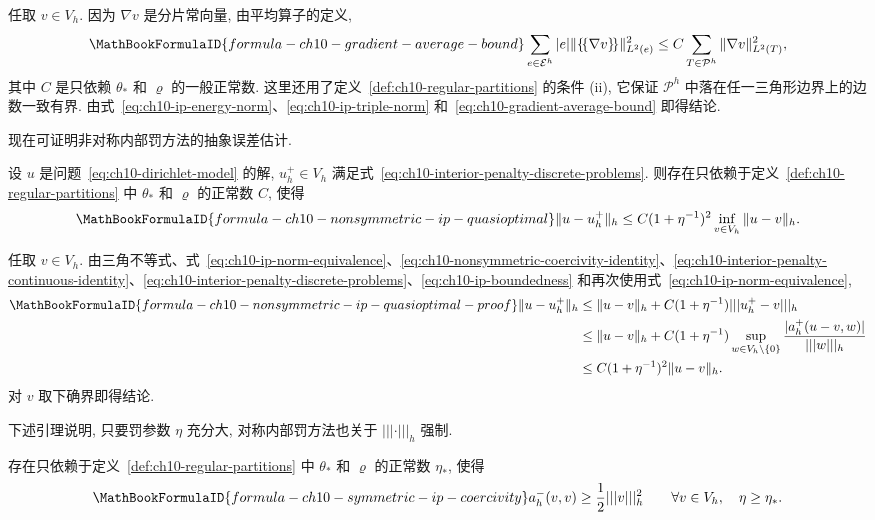 \begin{Proof}
任取 $v\in V_h$. 因为 $\nabla v$ 是分片常向量, 由平均算子的定义,
\begin{equation}
\MathBookFormulaID{formula-ch10-gradient-average-bound}
\label{eq:ch10-gradient-average-bound}
\sum_{e\in\mathcal E^h}|e|\|\{\!\{\nabla v\}\!\}\|_{L^2(e)}^2
\leq C\sum_{T\in\mathcal P^h}\|\nabla v\|_{L^2(T)}^2,
\end{equation}
其中 $C$ 是只依赖 $\theta_*$ 和 $\varrho$ 的一般正常数. 这里还用了定义~\ref{def:ch10-regular-partitions} 的条件 (ii), 它保证 $\mathcal P^h$ 中落在任一三角形边界上的边数一致有界. 由式~\eqref{eq:ch10-ip-energy-norm}、\eqref{eq:ch10-ip-triple-norm} 和~\eqref{eq:ch10-gradient-average-bound} 即得结论.
\end{Proof}

现在可证明非对称内部罚方法的抽象误差估计.

\begin{Lemma}
\label{lem:ch10-nonsymmetric-ip-quasioptimal}
设 $u$ 是问题~\eqref{eq:ch10-dirichlet-model} 的解, $u_h^+\in V_h$ 满足式~\eqref{eq:ch10-interior-penalty-discrete-problems}. 则存在只依赖于定义~\ref{def:ch10-regular-partitions} 中 $\theta_*$ 和 $\varrho$ 的正常数 $C$, 使得
\[
\MathBookFormulaID{formula-ch10-nonsymmetric-ip-quasioptimal}
\|u-u_h^+\|_h\leq C(1+\eta^{-1})^2\inf_{v\in V_h}\|u-v\|_h.
\]
\end{Lemma}

\begin{Proof}
任取 $v\in V_h$. 由三角不等式、式~\eqref{eq:ch10-ip-norm-equivalence}、\eqref{eq:ch10-nonsymmetric-coercivity-identity}、\eqref{eq:ch10-interior-penalty-continuous-identity}、\eqref{eq:ch10-interior-penalty-discrete-problems}、\eqref{eq:ch10-ip-boundedness} 和再次使用式~\eqref{eq:ch10-ip-norm-equivalence},
\begin{align*}
\MathBookFormulaID{formula-ch10-nonsymmetric-ip-quasioptimal-proof}
\|u-u_h^+\|_h
&\leq\|u-v\|_h+C(1+\eta^{-1})|||u_h^+-v|||_h\\
&\leq\|u-v\|_h+C(1+\eta^{-1})
\sup_{w\in V_h\setminus\{0\}}\frac{|a_h^+(u-v,w)|}{|||w|||_h}\\
&\leq C(1+\eta^{-1})^2\|u-v\|_h.
\end{align*}
对 $v$ 取下确界即得结论.
\end{Proof}

下述引理说明, 只要罚参数 $\eta$ 充分大, 对称内部罚方法也关于 $|||\cdot|||_h$ 强制.

\begin{Lemma}
\label{lem:ch10-symmetric-ip-coercivity}
存在只依赖于定义~\ref{def:ch10-regular-partitions} 中 $\theta_*$ 和 $\varrho$ 的正常数 $\eta_*$, 使得
\begin{equation}
\MathBookFormulaID{formula-ch10-symmetric-ip-coercivity}
\label{eq:ch10-symmetric-ip-coercivity}
a_h^-(v,v)\geq\frac12|||v|||_h^2
\qquad\forall v\in V_h,\quad\eta\geq\eta_*.
\end{equation}
\end{Lemma}

